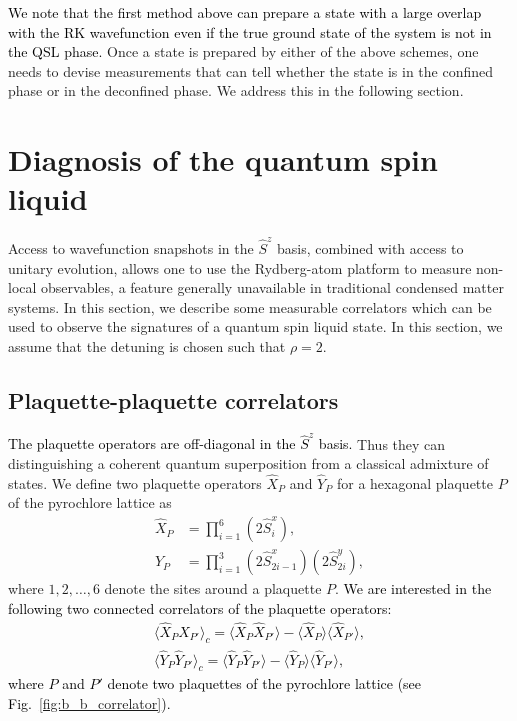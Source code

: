 \documentclass[twocolumn,superscriptaddress,amsmath,amssymb,aps,prx,nofootinbib]{revtex4-2}
\newcommand{\newtext}[1]{\textcolor{black}{#1}}
\begin{document}
\newtext{We note that the first method above can prepare a state with a large overlap with the RK wavefunction even if the true ground state of the system is not in the QSL phase.}
Once a state is prepared by either of the above schemes, one needs to devise measurements that can tell whether the state is in the confined phase or in the deconfined phase. We address this in the following section.

\section{Diagnosis of the quantum spin liquid}\label{sec:diagnostics}
Access to wavefunction snapshots in the $\hat{S}^z$ basis, combined with access to unitary evolution, allows one to use the Rydberg-atom platform to measure non-local observables, a feature generally unavailable in traditional condensed matter systems. In this section, we describe some measurable correlators which can be used to observe the signatures of a quantum spin liquid state. In this section, we  assume that the detuning is chosen such that $\rho = 2$.



\subsection{Plaquette-plaquette correlators}

 \newtext{The plaquette operators are  off-diagonal in the $\hat{S}^z$ basis.} Thus they can distinguishing a coherent quantum superposition from a classical admixture of states. We define two plaquette operators $\hat{X}_P$ and $\hat{Y}_P$ for a hexagonal plaquette $P$ of the pyrochlore lattice as 
 \begin{equation} \label{eq:xp_yp_def}
  \begin{aligned}
    \hat{X}_{P} &=  \prod_{i =1}^{6} \left( 2\hat{S}_i^x \right) ,\\
    \hat{Y}_{P} & = \prod_{i = 1}^{3} \left( 2\hat{S}_{2i-1}^x \right) \left( 2\hat{S}_{2i}^y \right),
\end{aligned}
\end{equation}
where $1,2,\ldots,6$ denote the sites around a plaquette $P$. \newtext{We are interested in the following two connected correlators of the plaquette operators:
\begin{equation}
\begin{aligned}
\label{eq:conn_corr_x_y}
    \langle \hat{X}_{P} \hat{X}_{P'} \rangle_c = \langle \hat{X}_P \hat{X}_{P'} \rangle - \langle \hat{X}_P \rangle \langle \hat{X}_{P'} \rangle,\\
    \langle \hat{Y}_P \hat{Y}_{P'} \rangle_c = \langle \hat{Y}_P \hat{Y}_{P'} \rangle - \langle \hat{Y}_P  \rangle \langle  \hat{Y}_{P'} \rangle,
\end{aligned}
\end{equation}
where $P$ and $P'$ denote two plaquettes of the pyrochlore lattice (see Fig.~\ref{fig:b_b_correlator}).
}
\end{document}
